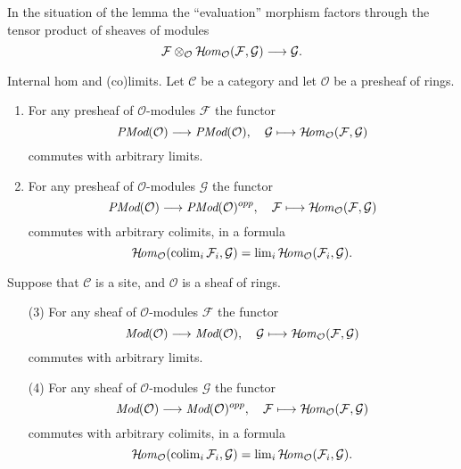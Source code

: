 \noindent
In the situation of the lemma the ``evaluation'' morphism
factors through the tensor product of sheaves of modules
$$
\mathcal{F}
\otimes_\mathcal{O}
\mathop{\mathcal{H}\!{\it om}}\nolimits_\mathcal{O}(\mathcal{F}, \mathcal{G})
\longrightarrow
\mathcal{G}.
$$

\begin{lemma}
\label{lemma-internal-hom-commute-limits}
Internal hom and (co)limits.
Let $\mathcal{C}$ be a category and let $\mathcal{O}$ be a presheaf of rings.
\begin{enumerate}
\item For any presheaf of $\mathcal{O}$-modules $\mathcal{F}$ the functor
$$
\textit{PMod}(\mathcal{O}) \longrightarrow \textit{PMod}(\mathcal{O})
, \quad
\mathcal{G} \longmapsto \mathop{\mathcal{H}\!{\it om}}\nolimits_\mathcal{O}(\mathcal{F}, \mathcal{G})
$$
commutes with arbitrary limits.
\item For any presheaf of $\mathcal{O}$-modules $\mathcal{G}$ the functor
$$
\textit{PMod}(\mathcal{O}) \longrightarrow \textit{PMod}(\mathcal{O})^{opp}
, \quad
\mathcal{F} \longmapsto \mathop{\mathcal{H}\!{\it om}}\nolimits_\mathcal{O}(\mathcal{F}, \mathcal{G})
$$
commutes with arbitrary colimits, in a formula
$$
\mathop{\mathcal{H}\!{\it om}}\nolimits_\mathcal{O}(\mathop{\rm colim}\nolimits_i \mathcal{F}_i, \mathcal{G})
=
\mathop{\rm lim}\nolimits_i \mathop{\mathcal{H}\!{\it om}}\nolimits_\mathcal{O}(\mathcal{F}_i, \mathcal{G}).
$$
\end{enumerate}
Suppose that $\mathcal{C}$ is a site, and $\mathcal{O}$ is a sheaf of rings.
\begin{enumerate}
\item[(3)] For any sheaf of $\mathcal{O}$-modules $\mathcal{F}$ the functor
$$
\textit{Mod}(\mathcal{O}) \longrightarrow \textit{Mod}(\mathcal{O})
, \quad
\mathcal{G} \longmapsto \mathop{\mathcal{H}\!{\it om}}\nolimits_\mathcal{O}(\mathcal{F}, \mathcal{G})
$$
commutes with arbitrary limits.
\item[(4)] For any sheaf of $\mathcal{O}$-modules $\mathcal{G}$ the functor
$$
\textit{Mod}(\mathcal{O}) \longrightarrow \textit{Mod}(\mathcal{O})^{opp}
, \quad
\mathcal{F} \longmapsto \mathop{\mathcal{H}\!{\it om}}\nolimits_\mathcal{O}(\mathcal{F}, \mathcal{G})
$$
commutes with arbitrary colimits, in a formula
$$
\mathop{\mathcal{H}\!{\it om}}\nolimits_\mathcal{O}(\mathop{\rm colim}\nolimits_i \mathcal{F}_i, \mathcal{G})
=
\mathop{\rm lim}\nolimits_i \mathop{\mathcal{H}\!{\it om}}\nolimits_\mathcal{O}(\mathcal{F}_i, \mathcal{G}).
$$
\end{enumerate}
\end{lemma}

